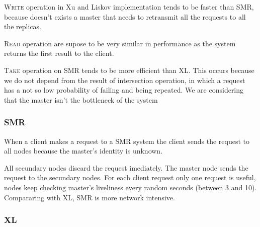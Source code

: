 \documentclass[times, 10pt,twocolumn]{article}
\begin{document}


\textsc{Write} operation in Xu and Liskov implementation tends to be faster than SMR, because doesn't exists a master
that needs to retransmit all the requests to all the replicas.

\textsc{Read} operation are supose to be very similar in performance as the system returns the first result to the client.

\textsc{Take} operation on SMR tends to be more efficient than XL. This occurs because we do not depend from the result 
of intersection operation, in which a request has a not so low probability of failing and being repeated. 
We are considering that the master isn't the bottleneck of the system  


\subsubsection{SMR}


When a client makes a request to a SMR system the client sends the request to all nodes because the master's identity is unknown.

All secundary nodes discard the request imediately. The master node
sends the request to the secundary nodes. For each client request only one request is useful, nodes keep checking master's liveliness every random seconds (between 3 and 10). 
Compararing with XL, SMR is more network intensive.

\subsubsection{XL}
\end{document}
